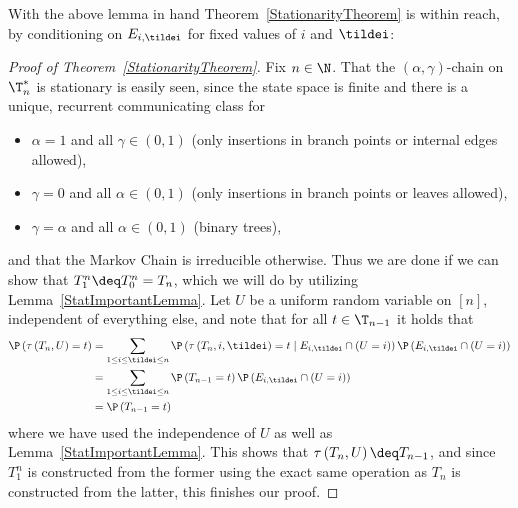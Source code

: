 %
With the above lemma in hand Theorem~\ref{StationarityTheorem} is within reach, by conditioning on $E_{i, \tildei}$ for fixed values of $i$ and $\tildei$:
%
\begin{proof}[Proof of Theorem~\ref{StationarityTheorem}]
    Fix $n \in \N$.
    That the $(\alpha, \gamma)$-chain on $\T_n^*$ is stationary is easily seen, since the state space is finite and there is a unique, recurrent communicating class for
    \begin{itemize}
        \item $\alpha = 1$ and all $\gamma \in (0,1)$ (only insertions in branch points or internal edges allowed),
        \item $\gamma = 0$ and all $\alpha \in (0,1)$ (only insertions in branch points or leaves allowed),
        \item $\gamma = \alpha$ and all $\alpha \in (0,1)$ (binary trees),
    \end{itemize}
    and that the Markov Chain is irreducible otherwise.
    Thus we are done if we can show that $T_1^n \deq T_0^n = T_n$, which we will do by utilizing Lemma~\ref{StatImportantLemma}.
    Let $U$ be a uniform random variable on $[n]$, independent of everything else, and note that for all $t \in \T_{n-1}$ it holds that
    \begin{align*}
        \P \left( \tau \left( T_n, U \right) = t \right)
        &= \sum_{1 \leq i \leq \tildei \leq n} \P \left( \tau \left( T_n, i, \tildei \right) = t \mid E_{i, \tildei} \cap (U = i) \right) \P \left( E_{i, \tildei} \cap (U = i) \right) \\
        &= \sum_{1 \leq i \leq \tildei \leq n} \P \left( T_{n-1} = t \right) \P \left( E_{i, \tildei} \cap (U = i) \right) \\
        &= \P \left( T_{n-1} = t \right)
    \end{align*}
    where we have used the independence of $U$ as well as Lemma~\ref{StatImportantLemma}.
    This shows that $\tau \left( T_n, U \right) \deq T_{n-1}$, and since $T_1^n$ is constructed from the former using the exact same operation as $T_n$ is constructed from the latter, this finishes our proof.
\end{proof}
